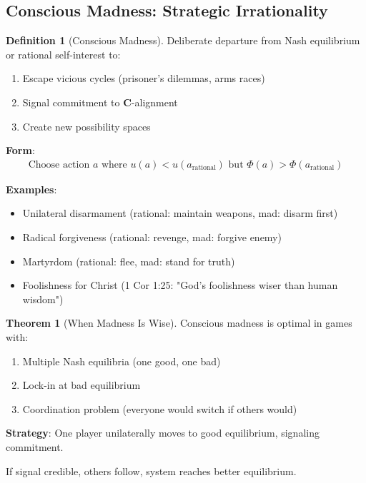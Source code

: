 \documentclass[11pt,a4paper]{article}
\theoremstyle{definition}
\newtheorem{definition}{Definition}[section]
\newtheorem{theorem}{Theorem}[section]
\theoremstyle{remark}
\begin{document}
\begin{small}
\begin{enumerate}
\subsection{Conscious Madness: Strategic Irrationality}

\begin{definition}[Conscious Madness]
Deliberate departure from Nash equilibrium or rational self-interest to:
\begin{enumerate}
    \item Escape vicious cycles (prisoner's dilemmas, arms races)
    \item Signal commitment to \(\mathbf{C}\)-alignment
    \item Create new possibility spaces
\end{enumerate}

\textbf{Form}:
\begin{align}
\text{Choose action } a \text{ where } u(a) < u(a_{\text{rational}}) \text{ but } \Phi(a) > \Phi(a_{\text{rational}})
\end{align}

\textbf{Examples}:
\begin{itemize}
    \item Unilateral disarmament (rational: maintain weapons, mad: disarm first)
    \item Radical forgiveness (rational: revenge, mad: forgive enemy)
    \item Martyrdom (rational: flee, mad: stand for truth)
    \item Foolishness for Christ (1 Cor 1:25: "God's foolishness wiser than human wisdom")
\end{itemize}
\end{definition}

\begin{theorem}[When Madness Is Wise]
Conscious madness is optimal in games with:
\begin{enumerate}
    \item Multiple Nash equilibria (one good, one bad)
    \item Lock-in at bad equilibrium
    \item Coordination problem (everyone would switch if others would)
\end{enumerate}

\textbf{Strategy}: One player unilaterally moves to good equilibrium, signaling commitment.

If signal credible, others follow, system reaches better equilibrium.


\end{theorem}
\end{enumerate}
\end{small}
\end{document}
